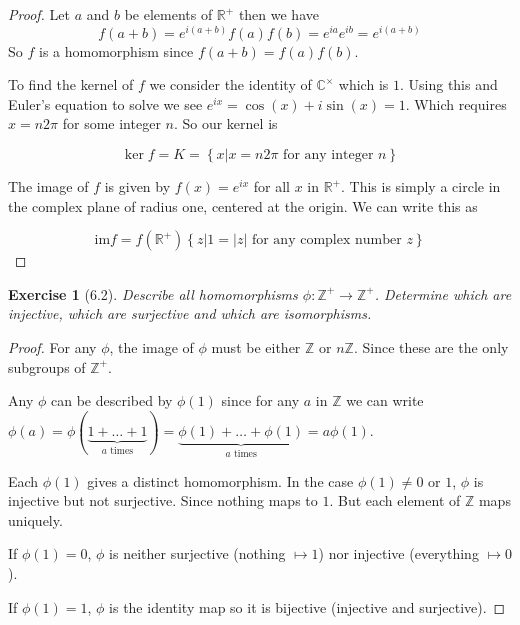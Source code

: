 \documentclass[12pt,leqno]{article}
\numberwithin{equation}{section}
\newtheorem*{exer}{Exercise}
\theoremstyle{definition}
\begin{document}
\begin{proof}[Proof]

    Let $a$ and $b$ be elements of $\mathbb R^+$ then we have
    $$
    f(a + b) = e^{i(a + b)}
    f(a)f(b) = e^{ia} e^{ib} = e^{i(a + b)}
    $$
    So $f$ is a homomorphism since $f(a + b) = f(a)f(b)$.

    To find the kernel of $f$ we consider the identity of $\mathbb C^{\times}$
    which is $1$.  Using this and Euler's equation to solve we see $e^{ix} =
    \cos(x) + i\sin(x) = 1$. Which requires $x = n 2 \pi$ for some integer $n$.
    So our kernel is

    $$
    \ker f = K = \left\{x \vert x = n 2 \pi \text{ for any integer } n \right\}
    $$

    The image of $f$ is given by $f(x) = e^{ix} $ for all $x$ in $\mathbb R^+$.
    This is simply a circle in the complex plane of radius one, centered at the
    origin. We can write this as 
    
    $$
    \text{im} f = f(\mathbb R^+) \left\{z \vert 1 = |z| \text{ for any complex number }z \right\}
    $$

\end{proof}

\begin{exer}[6.2]
Describe all homomorphisms $\phi: \mathbb Z^{+} \rightarrow \mathbb Z^+$.
Determine which are injective, which are surjective and which are isomorphisms.
\end{exer}

\begin{proof}[Proof]

    For any $\phi$, the image of $\phi$ must be either $\mathbb Z$ or $n \mathbb Z$.
    Since these are the only subgroups of $\mathbb Z^+$.

    Any $\phi$ can be described by $\phi(1)$ since for any $a$ in $\mathbb Z$
    we can write $\phi(a) = \phi(\underbrace{1 + \dots + 1}_{a \text{ times}})
    = \underbrace{\phi(1) + \dots + \phi(1)}_{a \text{ times}} = a \phi(1)$.

    Each $\phi(1)$ gives a distinct homomorphism. In the case $\phi(1) \neq 0 \text{ or } 1$, $\phi$ is
    injective but not surjective. Since nothing maps to $1$. But each element of $\mathbb Z$ maps uniquely.

    If $\phi(1) = 0$, $\phi$ is neither surjective (nothing $\mapsto 1$) nor injective (everything $\mapsto 0$).

    If $\phi(1) = 1$, $\phi$ is the identity map so it is bijective (injective and surjective). 

\end{proof}
\end{document}
